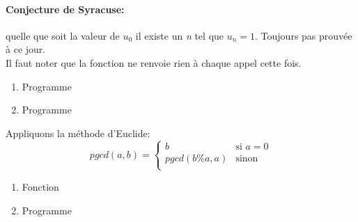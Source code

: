 \documentclass[a4paper,11pt]{article}
\begin{document}
\begin{Form}
\begin{exo}
\begin{commentprof}
\paragraph{Conjecture de Syracuse:} quelle que soit la valeur de $u_0$ il existe un \emph{n} tel que $u_n=1$. Toujours pas prouvée à ce jour.\\
Il faut noter que la fonction ne renvoie rien à chaque appel cette fois.
\end{commentprof}
\end{exo}
\begin{exo}
\begin{enumerate}
\item Programme

\item Programme

\end{enumerate}
\end{exo}
\begin{exo}
Appliquons la méthode d'Euclide:
$$
pgcd(a,b) = \left\{
    \begin{array}{ll}
        b & \mbox{si } a=0\\
        pgcd(b\%a,a) & \mbox{sinon}\\
    \end{array}
\right.
$$

\end{exo}
\begin{exo}

\end{exo}
\begin{exo}
\begin{enumerate}
\item Fonction

\item Programme

\end{enumerate}
\end{exo}
\end{Form}
\end{document}
